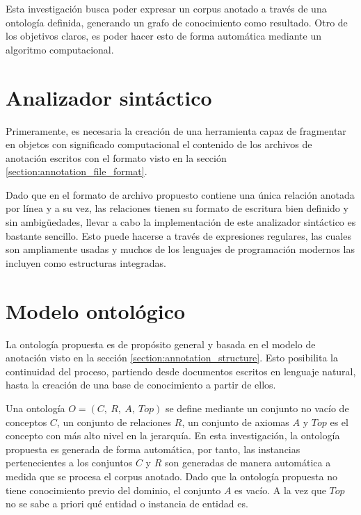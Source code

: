 \label{chapter:proposed_solution}
\vspace{-0.3in}
Esta investigación busca poder expresar un corpus anotado a través de una ontología definida, generando un grafo de conocimiento como resultado. Otro de los objetivos claros, es poder hacer esto de forma automática mediante un algoritmo computacional.

\vspace{-0.1in}
\section{Analizador sintáctico}
\vspace{-0.1in}
Primeramente, es necesaria la creación de una herramienta capaz de fragmentar en objetos con significado computacional el contenido de los archivos de anotación escritos con el formato visto en la sección \ref{section:annotation_file_format}.

Dado que en el formato de archivo propuesto contiene una única relación anotada por línea y a su vez, las relaciones tienen su formato de escritura bien definido y sin ambigüedades, llevar a cabo la implementación de este analizador sintáctico es bastante sencillo. Esto puede hacerse a través de expresiones regulares, las cuales son ampliamente usadas y muchos de los lenguajes de programación modernos las incluyen como estructuras integradas.

\vspace{-0.1in}
\section{Modelo ontológico}
\vspace{-0.1in}
La ontología propuesta es de propósito general y basada en el modelo de anotación visto en la sección \ref{section:annotation_structure}. Esto posibilita la continuidad del proceso, partiendo desde documentos escritos en lenguaje natural, hasta la creación de una base de conocimiento a partir de ellos.

Una ontología $O=(C,~R,~A,~Top)$ se define mediante un conjunto no vacío de conceptos $C$, un conjunto de relaciones $R$, un conjunto de axiomas $A$ y $Top$ es el concepto con más alto nivel en la jerarquía. En esta investigación, la ontología propuesta es generada de forma automática, por tanto, las instancias pertenecientes a los conjuntos $C$ y $R$ son generadas de manera automática a medida que se procesa el corpus anotado. Dado que la ontología propuesta no tiene conocimiento previo del dominio, el conjunto $A$ es vacío. A la vez que $Top$ no se sabe a priori qué entidad o instancia de entidad es.

